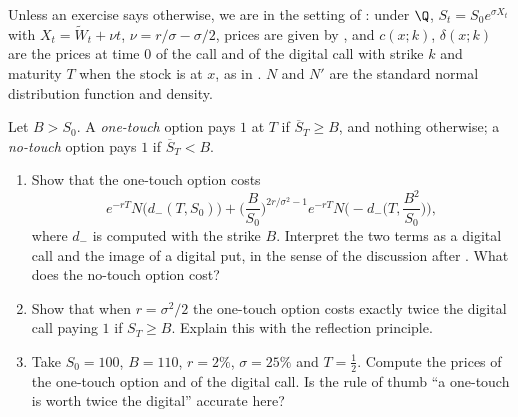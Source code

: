 
Unless an exercise says otherwise, we are in the setting of : under $\Q$,
$S_t=S_0e^{\sigma X_t}$ with $X_t=\widetilde W_t+\nu t$, $\nu=r/\sigma-\sigma/2$, prices are given by
, and $c(x;k)$, $\delta(x;k)$ are the prices at time $0$ of the call and of
the digital call with strike $k$ and maturity $T$ when the stock is at $x$, as in
. $N$ and $N'$ are the standard normal distribution function and
density.

\begin{exercise}\label{ex:exo-touch}
\easy Let $B>S_0$. A \emph{one-touch} option pays $1$ at $T$ if $\overline S_T\ge B$, and nothing
otherwise; a \emph{no-touch} option pays $1$ if $\overline S_T<B$.
\begin{enumerate}[label=(\alph*)]
  \item Show that the one-touch option costs
    \[
      e^{-rT}N\big(d_-(T,S_0)\big)+\Big(\frac B{S_0}\Big)^{2r/\sigma^2-1}e^{-rT}N\Big(-d_-\Big(T,\frac{B^2}{S_0}\Big)\Big),
    \]
    where $d_-$ is computed with the strike $B$. Interpret the two terms as a digital call and
    the image of a digital put, in the sense of the discussion after .
    What does the no-touch option cost?
  \item Show that when $r=\sigma^2/2$ the one-touch option costs exactly twice the digital call
    paying $1$ if $S_T\ge B$. Explain this with the reflection principle.
  \item Take $S_0=100$, $B=110$, $r=2\%$, $\sigma=25\%$ and $T=\frac12$. Compute the prices of the
    one-touch option and of the digital call. Is the rule of thumb ``a one-touch is worth twice the
    digital'' accurate here?
\end{enumerate}
\end{exercise}

